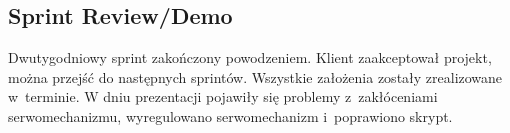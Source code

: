 
\subsection{Sprint Review/Demo}
	Dwutygodniowy sprint zakończony powodzeniem. Klient zaakceptował projekt, można przejść do następnych sprintów. Wszystkie założenia zostały zrealizowane w~terminie. W dniu prezentacji pojawiły się problemy z~zakłóceniami serwomechanizmu, wyregulowano serwomechanizm i~poprawiono skrypt.